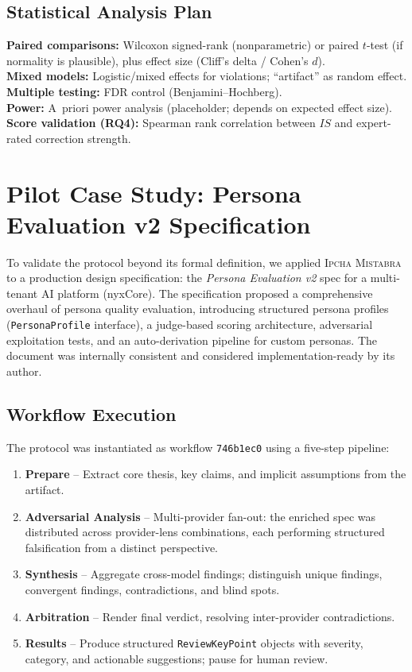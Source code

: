 \documentclass[11pt,a4paper]{article}
\newcommand{\methodname}{\textsc{Ipcha Mistabra}}
\begin{document}
\subsection{Statistical Analysis Plan}
\textbf{Paired comparisons:} Wilcoxon signed-rank (nonparametric) or paired $t$-test (if normality is plausible), plus effect size (Cliff's delta / Cohen's $d$).\\
\textbf{Mixed models:} Logistic/mixed effects for violations; ``artifact'' as random effect.\\
\textbf{Multiple testing:} FDR control (Benjamini--Hochberg).\\
\textbf{Power:} A~priori power analysis (placeholder; depends on expected effect size).\\
\textbf{Score validation (RQ4):} Spearman rank correlation between $\mathit{IS}$ and expert-rated correction strength.

\section{Pilot Case Study: Persona Evaluation v2 Specification}
\label{sec:pilot}

To validate the protocol beyond its formal definition, we applied \methodname{} to a production design specification: the \emph{Persona Evaluation v2} spec for a multi-tenant AI platform (nyxCore).
The specification proposed a comprehensive overhaul of persona quality evaluation, introducing structured persona profiles (\texttt{PersonaProfile} interface), a judge-based scoring architecture, adversarial exploitation tests, and an auto-derivation pipeline for custom personas.
The document was internally consistent and considered implementation-ready by its author.

\subsection{Workflow Execution}
The protocol was instantiated as workflow \texttt{746b1ec0} using a five-step pipeline:

\begin{enumerate}
  \item \textbf{Prepare} -- Extract core thesis, key claims, and implicit assumptions from the artifact.
  \item \textbf{Adversarial Analysis} -- Multi-provider fan-out: the enriched spec was distributed across provider-lens combinations, each performing structured falsification from a distinct perspective.
  \item \textbf{Synthesis} -- Aggregate cross-model findings; distinguish unique findings, convergent findings, contradictions, and blind spots.
  \item \textbf{Arbitration} -- Render final verdict, resolving inter-provider contradictions.
  \item \textbf{Results} -- Produce structured \texttt{ReviewKeyPoint} objects with severity, category, and actionable suggestions; pause for human review.
\end{enumerate}
\end{document}
